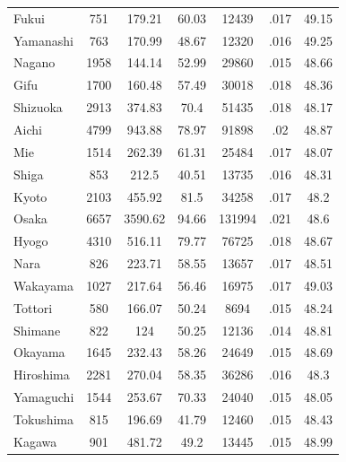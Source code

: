 \begin{tabular}{l*{6}{c}}
Fukui       &         751&      179.21&       60.03&       12439&        .017&       49.15\\
Yamanashi   &         763&      170.99&       48.67&       12320&        .016&       49.25\\
Nagano      &        1958&      144.14&       52.99&       29860&        .015&       48.66\\
Gifu        &        1700&      160.48&       57.49&       30018&        .018&       48.36\\
Shizuoka    &        2913&      374.83&        70.4&       51435&        .018&       48.17\\
Aichi       &        4799&      943.88&       78.97&       91898&         .02&       48.87\\
Mie         &        1514&      262.39&       61.31&       25484&        .017&       48.07\\
Shiga       &         853&       212.5&       40.51&       13735&        .016&       48.31\\
Kyoto       &        2103&      455.92&        81.5&       34258&        .017&        48.2\\
Osaka       &        6657&     3590.62&       94.66&      131994&        .021&        48.6\\
Hyogo       &        4310&      516.11&       79.77&       76725&        .018&       48.67\\
Nara        &         826&      223.71&       58.55&       13657&        .017&       48.51\\
Wakayama    &        1027&      217.64&       56.46&       16975&        .017&       49.03\\
Tottori     &         580&      166.07&       50.24&        8694&        .015&       48.24\\
Shimane     &         822&         124&       50.25&       12136&        .014&       48.81\\
Okayama     &        1645&      232.43&       58.26&       24649&        .015&       48.69\\
Hiroshima   &        2281&      270.04&       58.35&       36286&        .016&        48.3\\
Yamaguchi   &        1544&      253.67&       70.33&       24040&        .015&       48.05\\
Tokushima   &         815&      196.69&       41.79&       12460&        .015&       48.43\\
Kagawa      &         901&      481.72&        49.2&       13445&        .015&       48.99\\

\end{tabular}

